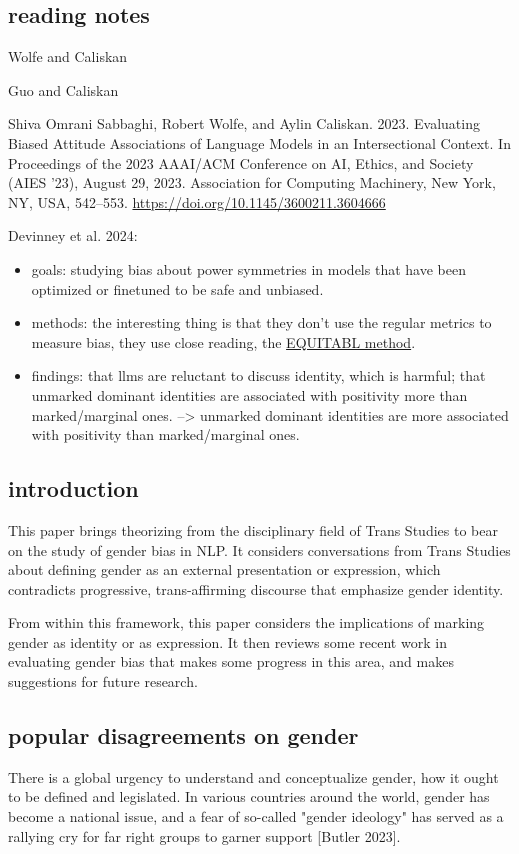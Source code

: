 \documentclass[11pt]{article}
\begin{document}
\subsection{reading notes}
\label{sec:org6d69858}
Wolfe and Caliskan

Guo and Caliskan

Shiva Omrani Sabbaghi, Robert Wolfe, and Aylin Caliskan. 2023.
Evaluating Biased Attitude Associations of Language Models in an
Intersectional Context. In Proceedings of the 2023 AAAI/ACM Conference
on AI, Ethics, and Society (AIES ’23), August 29, 2023. Association
for Computing Machinery, New York, NY, USA, 542–553.
\url{https://doi.org/10.1145/3600211.3604666}

Devinney et al. 2024:
\begin{itemize}
\item goals: studying bias about power symmetries in models that have been
optimized or finetuned to be safe and unbiased.
\item methods: the interesting thing is that they don't use the regular
metrics to measure bias, they use close reading, the
\href{https://aclanthology.org/2020.gebnlp-1.8/}{EQUITABL method}.
\item findings: that llms are reluctant to discuss identity, which is
harmful; that unmarked dominant identities are associated with
positivity more than marked/marginal ones.
--> unmarked dominant identities are more associated with positivity
than marked/marginal ones.
\end{itemize}


\subsection{introduction}
\label{sec:org9bf9f76}
This paper brings theorizing from the disciplinary field of Trans
Studies to bear on the study of gender bias in NLP. It considers
conversations from Trans Studies about defining gender as an external
presentation or expression, which contradicts progressive,
trans-affirming discourse that emphasize gender identity.

From within this framework, this paper considers the implications of
marking gender as identity or as expression. It then reviews some
recent work in evaluating gender bias that makes some progress in this
area, and makes suggestions for future research. 

\subsection{popular disagreements on gender}
\label{sec:org6d36cf6}
There is a global urgency to understand and conceptualize gender, how
it ought to be defined and legislated. In various countries around the
world, gender has become a national issue, and a fear of so-called
"gender ideology" has served as a rallying cry for far right groups to
garner support [Butler 2023].
\end{document}
